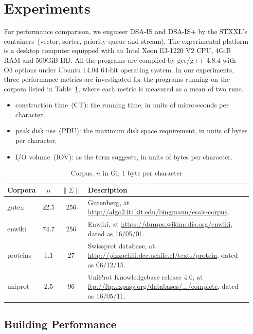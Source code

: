 \documentclass[10pt,journal,compsoc]{IEEEtran}
\begin{document}
\section{Experiments} \label{sec:experiments}

For performance comparison, we engineer DSA-IS and DSA-IS+ by the STXXL's containers~(vector, sorter, priority queue and stream). The experimental platform is a desktop computer equipped with an Intel Xeon E3-1220 V2 CPU, 4GiB RAM and 500GiB HD. All the programs are complied by gcc/g++ 4.8.4 with -O3 options under Ubuntu 14.04 64-bit operating system. In our experiments, three performance metrics are investigated for the programs running on the corpora listed in Table~\ref{tbl:corpora}, where each metric is measured as a mean of two runs.

\begin{itemize}
	\item construction time~(CT): the running time, in units of microseconds per character.
	\item peak disk use~(PDU): the maximum disk space requirement, in units of bytes per character.
	\item I/O volume~(IOV): as the term suggests, in units of bytes per character.
\end{itemize}

\renewcommand\arraystretch{1.3}
\begin{table}[!h]
	\caption{Corpus, $n$ in Gi, 1 byte per character}
	\label{tbl:corpora}
	\centering
	\begin{tabular}{|l|c|c|p{5cm}|}
		\hline
		Corpora & \multicolumn{1}{c|}{$n$} & \multicolumn{1}{c|}{$\|\Sigma\|$} & Description \\\hline
		guten & 22.5 & 256 & Gutenberg, at \url{http://algo2.iti.kit.edu/bingmann/esais-corpus}.\\\hline 				
		enwiki & 74.7 & 256 & Enwiki, at \url{https://dumps.wikimedia.org/enwiki}, dated as 16/05/01. \\\hline	
		proteins & 1.1 & 27 & Swissprot database, at \url{http://pizzachili.dcc.uchile.cl/texts/protein}, dated as 06/12/15. \\\hline
		uniprot & 2.5 & 96 & UniProt Knowledgebase release 4.0, at \url{ftp://ftp.expasy.org/databases/.../complete}, dated as 16/05/11. \\\hline
	\end{tabular}
\end{table}

\subsection{Building Performance}
\end{document}
